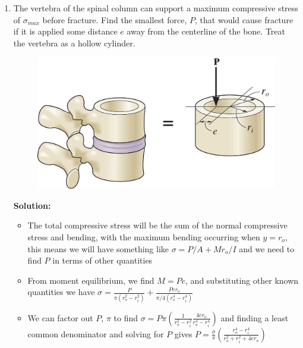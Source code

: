 \documentclass[12pt, oneside]{article}
\begin{document}
\begin{enumerate}
	\item %
		The vertebra of the spinal column can support a maximum compressive stress of $\sigma_{max}$ before fracture.
		Find the smallest force, $P$, that would cause fracture if it is applied some distance $e$ away from the centerline of the bone.
		Treat the vertebra as a hollow cylinder.
		\begin{figure}[H]
			\centering
			\includegraphics[width=0.6\linewidth]{8-52}
		\end{figure}
			\textbf{Solution:}
			\begin{itemize}
				\item The total compressive stress will be the sum of the normal compressive stress and bending, with the maximum bending occurring when $y=r_o$, this means we will have something like $\sigma = P/A + M r_o / I$ and we need to find $P$ in terms of other quantities
				\item From moment equilibrium, we find $M = Pe$, and substituting other known quantities we have $\sigma = \frac{P}{\pi(r_o^2-r_i^2)} + \frac{P e r_o}{\pi/4(r_o^4-r_i^4)}$
				\item We can factor out $P$, $\pi$ to find $\sigma = P \pi \left( \frac{1}{r_o^2 - r_i^2} \frac{4er_o}{r_o^4-r_i^4} \right)$ and finding a least common denominator and solving for $P$ gives $P = \frac{\sigma}{\pi}\left( \frac{r_o^4 - r_i^4}{r_o^2 + r_i^2 + 4er_o} \right)$
			\end{itemize}


\end{enumerate}
\end{document}
